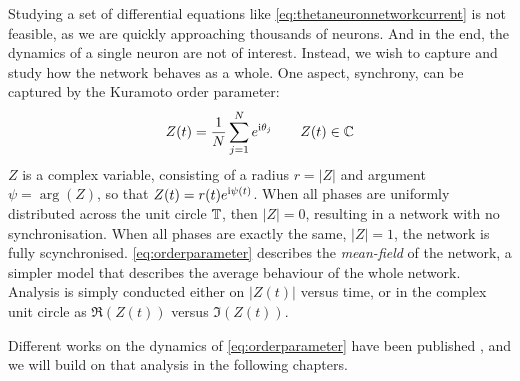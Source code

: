 Studying a set of differential equations like \eqref{eq:thetaneuronnetworkcurrent} is not feasible, as we are quickly approaching thousands of neurons. And in the end, the dynamics of a single neuron are not of interest. Instead, we wish to capture and study how the network behaves as a whole. One aspect, synchrony, can be captured by the Kuramoto order parameter:
\begin{align}
Z(t) = \frac{1}{N} \sum_{j=1}^N e^{{\rm{i}}\theta_j}  \qquad Z(t) \in {\mathbb{C}} \label{eq:orderparameter}
\end{align}
$Z$ is a complex variable, consisting of a radius $r = \rvert Z \rvert$ and argument $\psi = \arg \left( Z \right)$, so that $Z(t) = r(t) e^{{\rm{i}} \psi(t)}$. When all phases are uniformly distributed across the unit circle ${\mathbb{T}}$, then $\rvert Z \rvert = 0$, resulting in a network with no synchronisation. When all phases are exactly the same, $\rvert Z \rvert = 1$, the network is fully scynchronised. \eqref{eq:orderparameter} describes the \textsl{mean-field} of the network, a simpler model that describes the average behaviour of the whole network. Analysis is simply conducted either on $ \rvert Z(t) \rvert$ versus time, or in the complex unit circle as $\Re (Z(t))$ versus $\Im (Z(t))$.

Different works on the dynamics of \eqref{eq:orderparameter} have been published \cite{Luke2013, Martens2020}, and we will build on that analysis in the following chapters.


